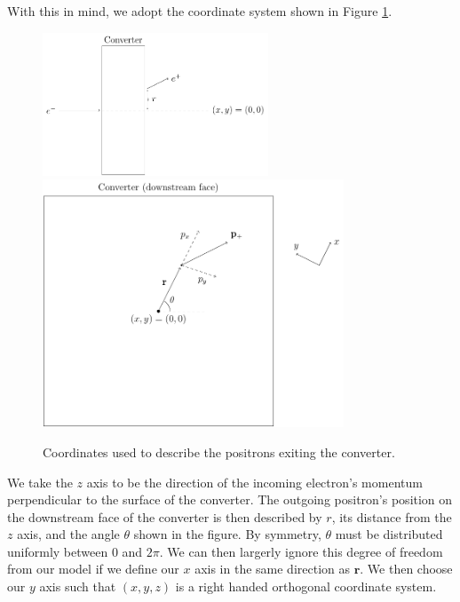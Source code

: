 \documentclass[12pt]{article}
\newcommand{\rrr}{\mathbf{r}}
\begin{document}
With this in mind, we adopt the coordinate system shown in Figure \ref{fig:coords}.
\begin{figure}
\centering
\includegraphics[width=0.6\textwidth]{coords1.pdf}
\includegraphics[width=0.8\textwidth]{coords2.pdf}
\caption{Coordinates used to describe the positrons exiting the converter.}
\label{fig:coords}
\end{figure}
We take the $z$ axis to be the direction of the incoming electron's momentum perpendicular to the surface of the converter.
The outgoing positron's position on the downstream face of the converter is then described by $r$, its distance from the $z$ axis, and the angle $\theta$ shown in the figure.
By symmetry, $\theta$ must be distributed uniformly between $0$ and $2\pi$.
We can then largerly ignore this degree of freedom from our model if we define our $x$ axis in the same direction as $\rrr$.
We then choose our $y$ axis such that $(x,y,z)$ is a right handed orthogonal coordinate system.
\end{document}
